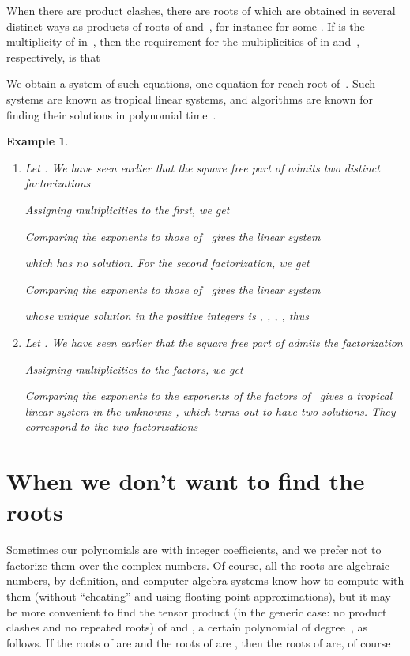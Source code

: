 \documentclass{sig-alternate}
\newtheorem{example}[theorem]{Example}
\begin{document}
When there are product clashes, there are roots  of  which are obtained
in several distinct ways as products of roots of  and~, for instance
 for some
.  If  is the multiplicity of  in~, then the
requirement for the multiplicities
 of
 in  and~, respectively, is
that

We obtain a
system of such equations, one equation for reach root of~.  Such systems are
known as tropical linear systems, and algorithms are known for finding their
solutions in polynomial time~\cite{grigoriev13}.

\begin{example}
  \begin{enumerate}
  \item 
  Let .
  We have seen earlier that the square free part  of  admits
  two distinct factorizations
  
  Assigning multiplicities to the first, we get
  
  Comparing the exponents to those of~ gives the linear system
  
  which has no solution. For the second factorization, we get
  
  Comparing the exponents to those of~ gives the linear system
  
  whose unique solution in the positive integers is , , , ,
  thus
  
  \item
    Let .
    We have seen earlier that the square free part  of  admits the factorization
    
    Assigning multiplicities to the factors, we get
    
    Comparing the exponents to the exponents of the factors of~ gives a tropical linear system
    in the unknowns , which turns out to have two solutions. They
    correspond to the two factorizations
        
  \end{enumerate}  
\end{example}


\section{When we don't want to find the roots}

Sometimes our polynomials are with integer coefficients, and we prefer not to factorize them over the complex numbers. Of course, all
the roots are algebraic numbers, by definition, and computer-algebra systems know how to compute with them (without ``cheating'' and using
floating-point approximations), but it may be more convenient to find the tensor product (in the generic case: no product
clashes and no repeated roots) of  and ,
a certain polynomial  of degree~, as follows.
If the roots of  are  and  the roots of  are , then
the roots of  are, of course
\end{document}
